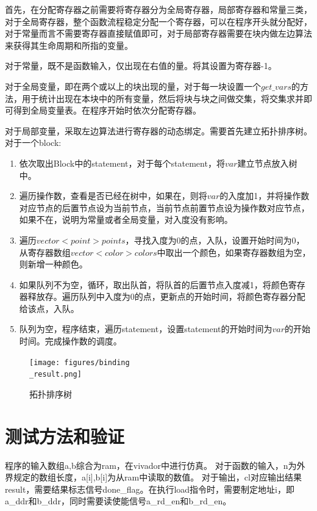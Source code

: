 \documentclass[12pt,hyperref,a4paper,UTF8]{ctexart}
\begin{document}
首先，在分配寄存器之前需要将寄存器分为全局寄存器，局部寄存器和常量三类，对于全局寄存器，整个函数流程稳定分配一个寄存器，可以在程序开头就分配好，对于常量而言不需要寄存器直接赋值即可，对于局部寄存器需要在块内做左边算法来获得其生命周期和所指的变量。

对于常量，既不是函数输入，仅出现在右值的量。将其设置为寄存器-1。

对于全局变量，即在两个或以上的块出现的量，对于每一块设置一个$get\_vars$的方法，用于统计出现在本块中的所有变量，然后将块与块之间做交集，将交集求并即可得到全局变量表。在程序开始时依次分配寄存器。

对于局部变量，采取左边算法进行寄存器的动态绑定。需要首先建立拓扑排序树。对于一个block:

\begin{enumerate}
\item 依次取出Block中的statement，对于每个statement，将$var$建立节点放入树中。
\item 遍历操作数，查看是否已经在树中，如果在，则将$var$的入度加1，并将操作数对应节点的后置节点设为当前节点，当前节点前置节点设为操作数对应节点，如果不在，说明为常量或者全局变量，对入度没有影响。
\item 遍历$vector<point>points$，寻找入度为0的点，入队，设置开始时间为0，从寄存器数组$vector<color>colors$中取出一个颜色，如果寄存器数组为空，则新增一种颜色。
\item 如果队列不为空，循环，取出队首，将队首的后置节点入度减1，将颜色寄存器释放存。遍历队列中入度为0的点，更新点的开始时间，将颜色寄存器分配给该点，入队。
\item 队列为空，程序结束，遍历statement，设置statement的开始时间为$var$的开始时间。完成操作数的调度。
\end{enumerate}

\begin{figure}
    \centering
    \texttt{[image: figures/binding\\\_result.png]}
    \caption{拓扑排序树}
    \label{fig:完成调度后的结果}
\end{figure}
\section{测试方法和验证}

程序的输入数组a,b综合为ram，在vivador中进行仿真。
对于函数的输入，n为外界规定的数组长度，a[i],b[i]为从ram中读取的数值。
对于输出，cl对应输出结果result，需要结果标志信号done\_flag。在执行load指令时，需要制定地址i，即a\_ddr和b\_ddr，同时需要读使能信号a\_rd\_en和b\_rd\_en。
\end{document}

